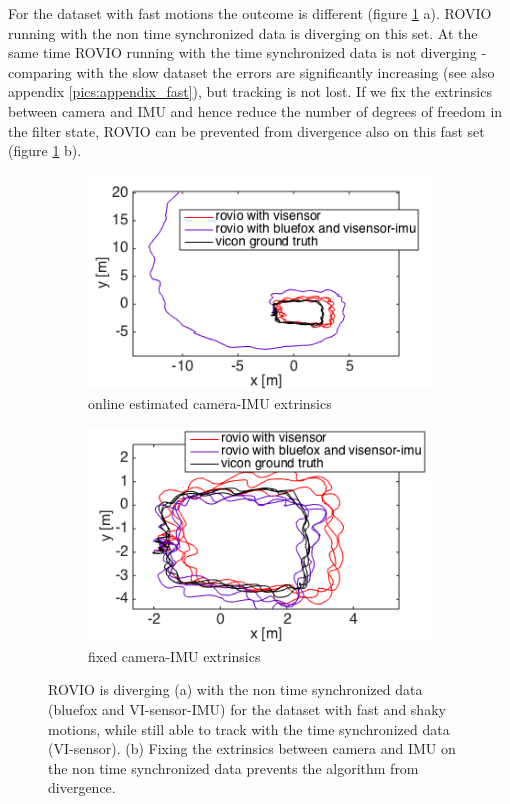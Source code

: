 For the dataset with fast motions the outcome is different (figure \ref{pics:timesync_fast} a). ROVIO running with the non time synchronized data is diverging on this set. At the same time ROVIO running with the time synchronized data is not diverging - comparing with the slow dataset the errors are significantly increasing (see also appendix \ref{pics:appendix_fast}), but tracking is not lost. If we fix the extrinsics between camera and IMU and hence reduce the number of degrees of freedom in the filter state, ROVIO can be prevented from divergence also on this fast set (figure \ref{pics:timesync_fast} b). \\

\begin{figure}
  \begin{subfigure}[b]{0.48\textwidth}
    \includegraphics[width=\textwidth]{images/fast_2D.png}
    \caption{online estimated camera-IMU extrinsics}
  \end{subfigure}
  \hfill
  \begin{subfigure}[b]{0.48\textwidth}
    \includegraphics[width=\textwidth]{images/fast_fixed_2D.png}
    \caption{fixed camera-IMU extrinsics}
  \end{subfigure}
   \caption{ROVIO is diverging (a) with the non time synchronized data (bluefox and VI-sensor-IMU) for the dataset with fast and shaky motions, while still able to track with the time synchronized data (VI-sensor). (b) Fixing the extrinsics between camera and IMU on the non time synchronized data prevents the algorithm from divergence.}
   \label{pics:timesync_fast}
\end{figure}

